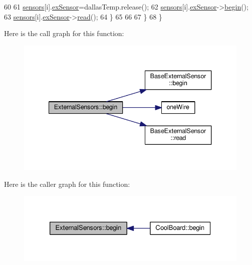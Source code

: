 \begin{DoxyCode}
60              
61             \hyperlink{class_external_sensors_a284233f884fcf00154a44740cf1d9e1e}{sensors}[i].\hyperlink{struct_external_sensors_1_1sensor_a9bca150fd468b8d0e090e6d72c5c2b48}{exSensor}=dallasTemp.release();
62             \hyperlink{class_external_sensors_a284233f884fcf00154a44740cf1d9e1e}{sensors}[i].\hyperlink{struct_external_sensors_1_1sensor_a9bca150fd468b8d0e090e6d72c5c2b48}{exSensor}->\hyperlink{class_base_external_sensor_a87d132803d4f4fdd4e66332809f0c9a0}{begin}();
63             \hyperlink{class_external_sensors_a284233f884fcf00154a44740cf1d9e1e}{sensors}[i].\hyperlink{struct_external_sensors_1_1sensor_a9bca150fd468b8d0e090e6d72c5c2b48}{exSensor}->\hyperlink{class_base_external_sensor_a1564f16deacf57b51b9948ac29db4291}{read}();
64         \}
65         
66         
67     \}
68 \}
\end{DoxyCode}
Here is the call graph for this function\+:\nopagebreak
\begin{figure}[H]
\begin{center}
\leavevmode
\includegraphics[width=340pt]{d1/d2f/class_external_sensors_a58ede0d786a86417254708870f04a21e_cgraph}
\end{center}
\end{figure}
Here is the caller graph for this function\+:\nopagebreak
\begin{figure}[H]
\begin{center}
\leavevmode
\includegraphics[width=326pt]{d1/d2f/class_external_sensors_a58ede0d786a86417254708870f04a21e_icgraph}
\end{center}
\end{figure}
\mbox{\label{class_external_sensors_a862a4bd11346b37270d0244c2adabe5a}} 
